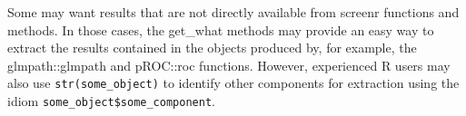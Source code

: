 \documentclass[11pt]{report}\usepackage[]{graphicx}\usepackage[]{xcolor}
\begin{document}
Some may want results that are not directly available from \textsf{screenr}
functions and methods. In those cases, the \textsf{get\_what} methods may
provide an easy way to extract the results contained in the objects
produced by, for example, the \textsf{glmpath::glmpath} and \textsf{pROC::roc}
functions. However, experienced R users may also use
\verb|str(some_object)| to identify other components for extraction using
the idiom \verb|some_object$some_component|.



\end{document}
